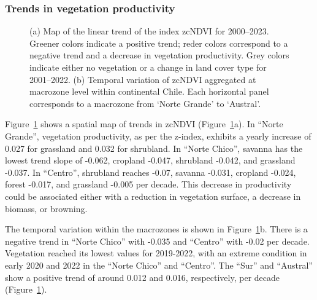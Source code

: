\documentclass[
  authoryear,
  preprint,
  3p,
  onecolumn]{elsarticle}
\begin{document}
\subsubsection{Trends in vegetation
productivity}\label{trends-in-vegetation-productivity}

\begin{figure}[!ht]


\caption{\label{fig-zcNDVI_var}(a) Map of the linear trend of the index
zcNDVI for 2000--2023. Greener colors indicate a positive trend; reder
colors correspond to a negative trend and a decrease in vegetation
productivity. Grey colors indicate either no vegetation or a change in
land cover type for 2001--2022. (b) Temporal variation of zcNDVI
aggregated at macrozone level within continental Chile. Each horizontal
panel corresponds to a macrozone from `Norte Grande' to `Austral'.}

\end{figure}%

Figure~\ref{fig-zcNDVI_var} shows a spatial map of trends in zcNDVI
(Figure~\ref{fig-zcNDVI_var}a). In ``Norte Grande'', vegetation
productivity, as per the z-index, exhibits a yearly increase of 0.027
for grassland and 0.032 for shrubland. In ``Norte Chico'', savanna has
the lowest trend slope of -0.062, cropland -0.047, shrubland -0.042, and
grassland -0.037. In ``Centro'', shrubland reaches -0.07, savanna
-0.031, cropland -0.024, forest -0.017, and grassland -0.005 per decade.
This decrease in productivity could be associated either with a
reduction in vegetation surface, a decrease in biomass, or browning.

The temporal variation within the macrozones is shown in
Figure~\ref{fig-zcNDVI_var}b. There is a negative trend in ``Norte
Chico'' with -0.035 and ``Centro'' with -0.02 per decade. Vegetation
reached its lowest values for 2019-2022, with an extreme condition in
early 2020 and 2022 in the ``Norte Chico'' and ``Centro''. The ``Sur''
and ``Austral'' show a positive trend of around 0.012 and 0.016,
respectively, per decade (Figure~\ref{fig-zcNDVI_var}).
\end{document}
